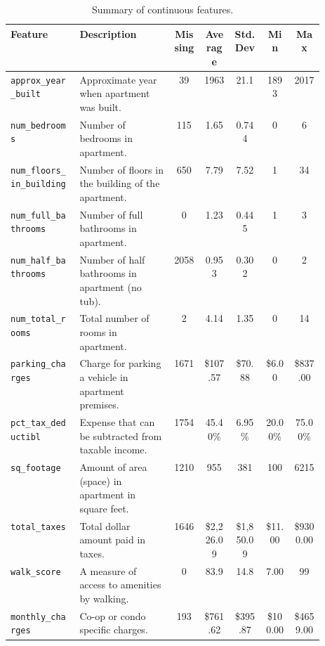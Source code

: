 \documentclass[11pt]{article}
\begin{document}
	\begin{table}
		\footnotesize
		\begin{tabular}{|p{0.22\linewidth}|p{0.30\linewidth}|c|c|c|c|c|}
			\hline
			\textbf{Feature} & \textbf{Description} & \textbf{Missing} & \textbf{Average} & \textbf{Std. Dev} & \textbf{Min} & \textbf{Max}\\
			\hline
			
			\verb|approx_year_built| & Approximate year when apartment was built. & 39 & 1963 & 21.1 & 1893 & 2017\\
			\hline
			
			\verb|num_bedrooms| & Number of bedrooms in apartment. & 115 & 1.65 & 0.744 & 0 & 6\\
			\hline
			
			\verb|num_floors_in_building| & Number of floors in the building of the apartment. & 650 & 7.79 & 7.52 & 1 & 34\\
			\hline
			
			\verb|num_full_bathrooms| & Number of full bathrooms in apartment. & 0 & 1.23 & 0.445 & 1 & 3\\
			\hline
			
			\verb|num_half_bathrooms| & Number of half bathrooms in apartment (no tub). & 2058 & 0.953 & 0.302 & 0 & 2\\
			\hline
			
			\verb|num_total_rooms| & Total number of rooms in apartment. & 2 & 4.14 & 1.35 & 0 & 14\\
			\hline
			
			\verb|parking_charges| & Charge for parking a vehicle in apartment premises. & 1671 & \$107.57 & \$70.88 & \$6.00 & \$837.00\\
			\hline
			
			\verb|pct_tax_deductibl| & Expense that can be subtracted from taxable income. & 1754 & 45.40\% & 6.95\% & 20.00\% & 75.00\%\\
			\hline
			
			\verb|sq_footage| & Amount of area (space) in apartment in square feet. & 1210 & 955 & 381 & 100 & 6215\\
			\hline
			
			\verb|total_taxes| & Total dollar amount paid in taxes. & 1646 & \$2,226.09 & \$1,850.09 & \$11.00 & \$9300.00\\
			\hline
			
			\verb|walk_score| & A measure of access to amenities by walking. & 0 & 83.9 & 14.8 & 7.00 & 99\\
			\hline
			
			\verb|monthly_charges| & Co-op or condo specific charges. & 193 & \$761.62 & \$395.87 & \$100.00 & \$4659.00\\
			\hline
		\end{tabular}
		\caption{Summary of continuous features.}
		\label{tbl:continuous-features}
	\end{table}
\end{document}
